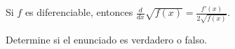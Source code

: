 \item Si $f$ es diferenciable, entonces $\frac{d}{dx} \sqrt{f(x)} = \frac{f'(x)}{2\sqrt{f(x)}}$.
\par
Determine si el enunciado es verdadero o falso.
